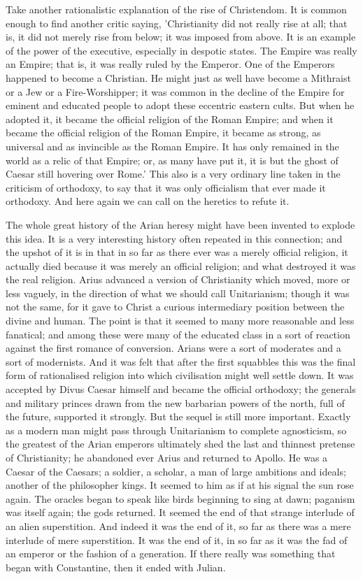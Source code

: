 Take another rationalistic explanation of the rise of Christendom. It is common enough to find another critic saying, 'Christianity did not really rise at all; that is, it did not merely rise from below; it was imposed from above. It is an example of the power of the executive, especially in despotic states. The Empire was really an Empire; that is, it was really ruled by the Emperor. One of the Emperors happened to become a Christian. He might just as well have become a Mithraist or a Jew or a Fire-Worshipper; it was common in the decline of the Empire for eminent and educated people to adopt these eccentric eastern cults. But when he adopted it, it became the official religion of the Roman Empire; and when it became the official religion of the Roman Empire, it became as strong, as universal and as invincible as the Roman Empire. It has only remained in the world as a relic of that Empire; or, as many have put it, it is but the ghost of Caesar still hovering over Rome.' This also is a very ordinary line taken in the criticism of orthodoxy, to say that it was only officialism that ever made it orthodoxy. And here again we can call on the heretics to refute it.

The whole great history of the Arian heresy might have been invented to explode this idea. It is a very interesting history often repeated in this connection; and the upshot of it is in that in so far as there ever was a merely official religion, it actually died because it was merely an official religion; and what destroyed it was the real religion. Arius advanced a version of Christianity which moved, more or less vaguely, in the direction of what we should call Unitarianism; though it was not the same, for it gave to Christ a curious intermediary position between the divine and human. The point is that it seemed to many more reasonable and less fanatical; and among these were many of the educated class in a sort of reaction against the first romance of conversion. Arians were a sort of moderates and a sort of modernists. And it was felt that after the first squabbles this was the final form of rationalised religion into which civilisation might well settle down. It was accepted by Divus Caesar himself and became the official orthodoxy; the generals and military princes drawn from the new barbarian powers of the north, full of the future, supported it strongly. But the sequel is still more important. Exactly as a modern man might pass through Unitarianism to complete agnosticism, so the greatest of the Arian emperors ultimately shed the last and thinnest pretense of Christianity; he abandoned ever Arius and returned to Apollo. He was a Caesar of the Caesars; a soldier, a scholar, a man of large ambitions and ideals; another of the philosopher kings. It seemed to him as if at his signal the sun rose again. The oracles began to speak like birds beginning to sing at dawn; paganism was itself again; the gods returned. It seemed the end of that strange interlude of an alien superstition. And indeed it was the end of it, so far as there was a mere interlude of mere superstition. It was the end of it, in so far as it was the fad of an emperor or the fashion of a generation. If there really was something that began with Constantine, then it ended with Julian.

